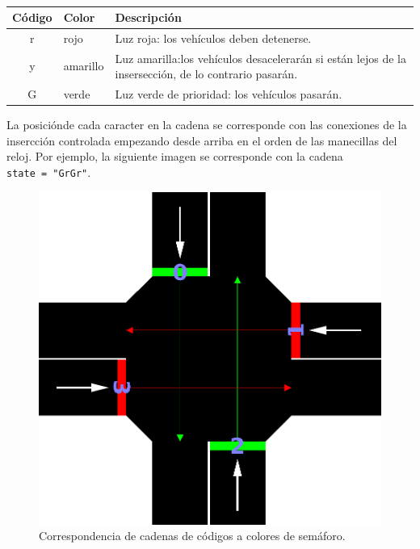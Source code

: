 \begin{table}[h!]
\centering
\begin{tabular}[t]{c l m{11cm}}
    \toprule
    Código  & Color        & Descripción                                                                                         \\
    \midrule
    r       & rojo         & Luz roja: los vehículos deben detenerse.                                                            \\ 
    y       & amarillo     & Luz amarilla:los vehículos desacelerarán si están lejos de la insersección, de lo contrario pasarán.\\
    G       & verde        & Luz verde de prioridad: los vehículos pasarán.                                                      \\
    \bottomrule
\end{tabular}
\caption{}
\label{table:tab1}
\end{table}

La posiciónde cada caracter en la cadena se corresponde con las
conexiones de la insercción controlada empezando desde arriba en el
orden de las manecillas del reloj. Por ejemplo, la siguiente imagen se
corresponde con la cadena \texttt{state\ =\ "GrGr"}.

\begin{figure}[H]
    \centering
\includegraphics[width=\textwidth]{sumo/tls_light_order.png}
    \caption{Correspondencia de cadenas de códigos a colores de semáforo.}
    \label{fig:netedit4}
\end{figure}


